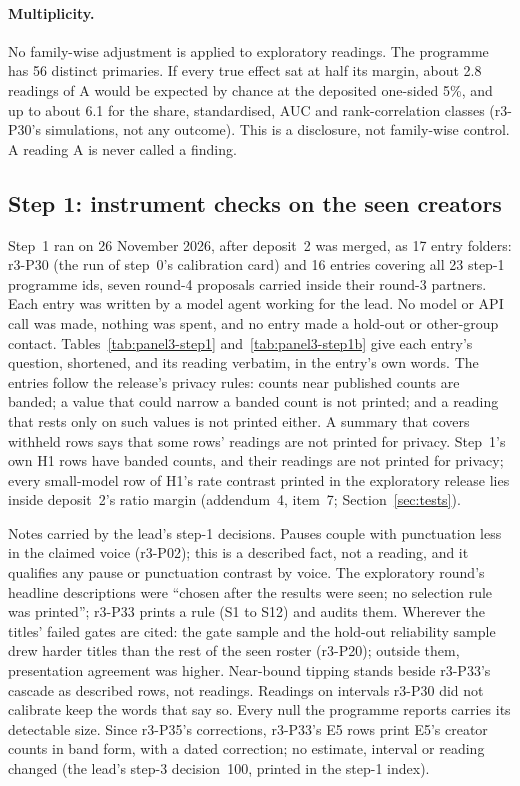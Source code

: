 \paragraph{Multiplicity.} No family-wise adjustment is applied to exploratory readings. The programme has 56 distinct
primaries. If every true effect sat at half its margin, about 2.8 readings of A would be expected by chance at the
deposited one-sided 5\%, and up to about 6.1 for the share, standardised, AUC and rank-correlation classes (r3-P30's
simulations, not any outcome). This is a disclosure, not family-wise control. A reading A is never called a finding.

\subsection{Step 1: instrument checks on the seen creators}
\label{app:panel3-step1}

Step~1 ran on 26 November 2026, after deposit~2 was merged, as 17 entry folders: r3-P30 (the run of step~0's
calibration card) and 16 entries covering all 23 step-1 programme ids, seven round-4 proposals carried inside their
round-3 partners. Each entry was written by a model agent working for the lead. No model or API call was made, nothing
was spent, and no entry made a hold-out or other-group contact. Tables~\ref{tab:panel3-step1}
and~\ref{tab:panel3-step1b} give each entry's question, shortened, and its reading verbatim, in the entry's own words.
The entries follow the release's privacy rules: counts near published counts are banded; a value that could narrow a
banded count is not printed; and a reading that rests only on such values is not printed either. A summary that covers
withheld rows says that some rows' readings are not printed for privacy. Step~1's own H1 rows have banded counts, and
their readings are not printed for privacy; every small-model row of H1's rate contrast printed in the exploratory
release lies inside deposit~2's ratio margin (addendum~4, item~7; Section~\ref{sec:tests}).

Notes carried by the lead's step-1 decisions. Pauses couple with punctuation less in the claimed voice (r3-P02); this
is a described fact, not a reading, and it qualifies any pause or punctuation contrast by voice. The exploratory
round's headline descriptions were ``chosen after the results were seen; no selection rule was printed''; r3-P33 prints
a rule (S1 to S12) and audits them. Wherever the titles' failed gates are cited: the gate sample and the hold-out
reliability sample drew harder titles than the rest of the seen roster (r3-P20); outside them, presentation agreement
was higher. Near-bound tipping stands beside r3-P33's cascade as described rows, not readings. Readings on intervals
r3-P30 did not calibrate keep the words that say so. Every null the programme reports carries its detectable size.
Since r3-P35's corrections, r3-P33's E5 rows print E5's creator counts in band form, with a dated correction; no
estimate, interval or reading changed (the lead's step-3 decision~100, printed in the step-1 index).

